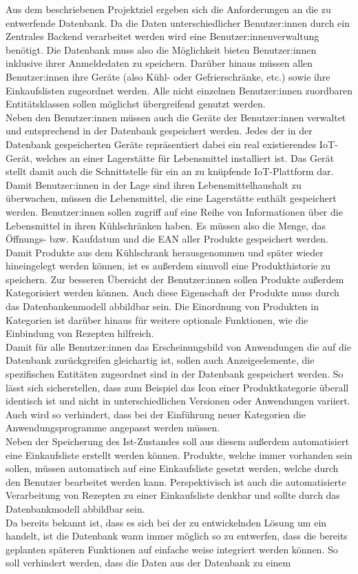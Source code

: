 Aus dem beschriebenen Projektziel ergeben sich die Anforderungen an die zu entwerfende Datenbank. Da die Daten unterschiedlicher Benutzer:innen durch ein Zentrales \gls{Backend} verarbeitet werden wird eine Benutzer:innenverwaltung benötigt. Die Datenbank muss also die Möglichkeit bieten Benutzer:innen inklusive ihrer Anmeldedaten zu speichern. Darüber hinaus müssen allen Benutzer:innen ihre Geräte (also Kühl- oder Gefrierschränke, etc.) sowie ihre Einkaufslisten zugeordnet werden. Alle nicht einzelnen Benutzer:innen zuordbaren \Gls{Entitätsklasse}n sollen möglichst übergreifend genutzt werden.\\ Neben den Benutzer:innen müssen auch die Geräte der Benutzer:innen verwaltet und entsprechend in der Datenbank gespeichert werden. Jedes der in der Datenbank gespeicherten Geräte repräsentiert dabei ein real existierendes IoT-Gerät, welches an einer Lagerstätte für Lebensmittel installiert ist. Das Gerät stellt damit auch die Schnittstelle für ein an zu knüpfende IoT-Plattform dar.\\ Damit Benutzer:innen in der Lage sind ihren Lebensmittelhaushalt zu überwachen, müssen die Lebensmittel, die eine Lagerstätte enthält gespeichert werden. Benutzer:innen sollen zugriff auf eine Reihe von Informationen über die Lebensmittel in ihren Kühlschränken haben. Es müssen also die Menge, das Öffnungs- bzw. Kaufdatum und die \gls{EAN} aller Produkte gespeichert werden. Damit Produkte aus dem Kühlschrank herausgenommen und später wieder hineingelegt werden können, ist es außerdem sinnvoll eine Produkthistorie zu speichern. Zur besseren Übersicht der Benutzer:innen sollen Produkte außerdem Kategorisiert werden können. Auch diese Eigenschaft der Produkte muss durch das Datenbankenmodell abbildbar sein. Die Einordnung von Produkten in Kategorien ist darüber hinaus für weitere optionale Funktionen, wie die Einbindung von Rezepten hilfreich.\\ Damit für alle Benutzer:innen das Erscheinungsbild von Anwendungen die auf die Datenbank zurückgreifen gleichartig ist, sollen auch Anzeigeelemente, die spezifischen Entitäten zugeordnet sind in der Datenbank gespeichert werden. So lässt sich sicherstellen, dass zum Beispiel das Icon einer Produktkategorie überall identisch ist und nicht in unterschiedlichen Versionen oder Anwendungen variiert. Auch wird so verhindert, dass bei der Einführung neuer Kategorien die Anwendungsprogramme angepasst werden müssen.\\ Neben der Speicherung des Ist-Zustandes soll aus diesem außerdem automatisiert eine Einkaufsliste erstellt werden können. Produkte, welche immer vorhanden sein sollen, müssen automatisch auf eine Einkaufsliste gesetzt werden, welche durch den Benutzer bearbeitet werden kann. Perspektivisch ist auch die automatisierte Verarbeitung von Rezepten zu einer Einkaufsliste denkbar und sollte durch das Datenbankmodell abbildbar sein.\\ Da bereits bekannt ist, dass es sich bei der zu entwickelnden Lösung um ein  handelt, ist die Datenbank wann immer möglich so zu entwerfen, dass die bereits geplanten späteren Funktionen auf einfache weise integriert werden können. So soll verhindert werden, dass die Daten aus der Datenbank zu einem 